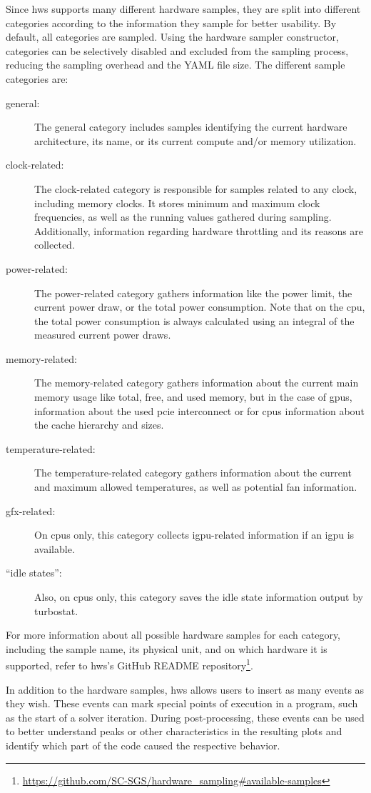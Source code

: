 Since hws supports many different hardware samples, they are split into different categories according to the information they sample for better usability. 
By default, all categories are sampled. 
Using the hardware sampler constructor, categories can be selectively disabled and excluded from the sampling process, reducing the sampling overhead and the YAML file size. 
The different sample categories are:
\begin{description}
    \item[general:]%
    The general category includes samples identifying the current hardware architecture, its name, or its current compute and/or memory utilization.
    \item[clock-related:]%
    The clock-related category is responsible for samples related to any clock, including memory clocks. 
    It stores minimum and maximum clock frequencies, as well as the running values gathered during sampling. 
    Additionally, information regarding hardware throttling and its reasons are collected.
    \item[power-related:]%
    The power-related category gathers information like the power limit, the current power draw, or the total power consumption. 
    Note that on the \gls{cpu}, the total power consumption is always calculated using an integral of the measured current power draws. 
    \item[memory-related:]%
    The memory-related category gathers information about the current main memory usage like total, free, and used memory, but in the case of \glspl{gpu}, information about the used \gls{pcie} interconnect or for \glspl{cpu} information about the cache hierarchy and sizes. 
    \item[temperature-related:]%
    The temperature-related category gathers information about the current and maximum allowed temperatures, as well as potential fan information. 
    \item[gfx-related:]%
    On \glspl{cpu} only, this category collects i\gls{gpu}-related information if an i\gls{gpu} is available. 
    \item[\enquote{idle states}:]%
    Also, on \glspl{cpu} only, this category saves the idle state information output by turbostat.
\end{description}
For more information about all possible hardware samples for each category, including the sample name, its physical unit, and on which hardware it is supported, refer to hws's GitHub README repository\footnote{\url{https://github.com/SC-SGS/hardware_sampling\#available-samples}}.

In addition to the hardware samples, hws allows users to insert as many events as they wish. 
These events can mark special points of execution in a program, such as the start of a solver iteration. 
During post-processing, these events can be used to better understand peaks or other characteristics in the resulting plots and identify which part of the code caused the respective behavior. 
